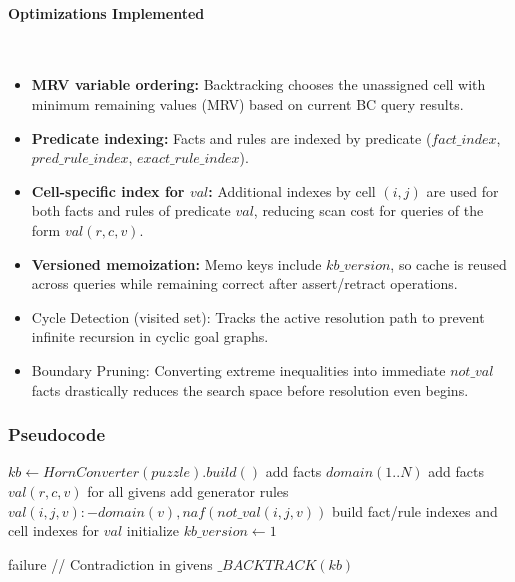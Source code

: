 \paragraph{Optimizations Implemented}~
\begin{itemize}
    \item \textbf{MRV variable ordering:} Backtracking chooses the unassigned cell with minimum remaining values (MRV) based on current BC query results.
    \item \textbf{Predicate indexing:} Facts and rules are indexed by predicate ($fact\_index$, $pred\_rule\_index$, $exact\_rule\_index$).
    \item \textbf{Cell-specific index for $val$:} Additional indexes by cell $(i,j)$ are used for both facts and rules of predicate $val$, reducing scan cost for queries of the form $val(r,c,v)$.
    \item \textbf{Versioned memoization:} Memo keys include $kb\_version$, so cache is reused across queries while remaining correct after assert/retract operations.
    \item Cycle Detection (visited set): Tracks the active resolution path to prevent infinite recursion in cyclic goal graphs.
    \item Boundary Pruning: Converting extreme inequalities into immediate $not\_val$ facts drastically reduces the search space before resolution even begins.
\end{itemize}


\subsubsection{Pseudocode}
\begin{algorithm}[H]
\caption{Master Coordinator}
\label{alg:label}
\begin{algorithmic}
\State $kb \gets HornConverter(puzzle).build()$
\State add facts $domain(1..N)$
\State add facts $val(r,c,v)$ for all givens
\State add generator rules $val(i,j,v) :- domain(v), naf(not\_val(i,j,v))$
\State build fact/rule indexes and cell indexes for $val$
\State initialize $kb\_version \gets 1$

\State\Return failure // Contradiction in givens
\EndIf
\EndFor
\State\Return $\_BACKTRACK(kb)$
\EndFunction
\end{algorithmic}
\end{algorithm}

